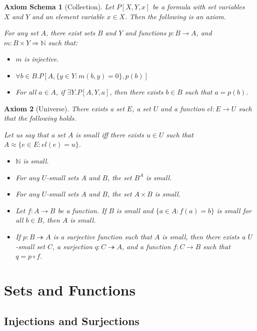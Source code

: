 \documentclass{book}
\newtheorem{ax}{Axiom}[section]
\newtheorem{axs}[ax]{Axiom Schema}
\theoremstyle{definition}
\begin{document}
\begin{axs}[Collection]
Let $P[X,Y,x]$ be a formula with set variables $X$ and $Y$ and an element variable $x \in X$. Then the following is an axiom.

For any set $A$, there exist sets $B$ and $Y$ and functions $p : B \rightarrow A$, and $m : B \times Y \Rightarrow \mathbb{N}$ such that:
\begin{itemize}
\item $m$ is injective.
\item $\forall b \in B. P[A, \{ y \in Y : m(b,y) = 0 \}, p(b)]$
\item For all $a \in A$, if $\exists Y. P[A,Y,a]$, then there exists $b \in B$ such that $a = p(b)$.
\end{itemize}
\end{axs}

\begin{ax}[Universe]
There exists a set $E$, a set $U$ and a function $el : E \rightarrow U$ such that the following holds.

Let us say that a set $A$ is \emph{small} iff there exists $u \in U$ such that $A \approx \{ e \in E : el(e) = u \}$.

\begin{itemize}
\item $\mathbb{N}$ is small.
\item For any $U$-small sets $A$ and $B$, the set $B^A$ is small.
\item For any $U$-small sets $A$ and $B$, the set $A \times B$ is small.
\item Let $f : A \rightarrow B$ be a function. If $B$ is small and $\{ a \in A : f(a) = b \}$ is small for all $b \in B$, then $A$ is small.
\item If $p : B \twoheadrightarrow A$ is a surjective function such that $A$ is small, then there exists a $U$-small set $C$, a surjection $q : C \twoheadrightarrow A$, and a function $f : C \rightarrow B$ such that $q = p \circ f$.
\end{itemize}
\end{ax}

\chapter{Sets and Functions}

\section{Injections and Surjections} %
\end{document}
